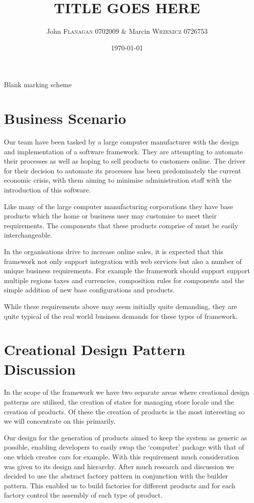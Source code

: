 \documentclass[pdftex,11pt,a4paper]{article}
\author{John \textsc{Flanagan} 0702009 \& Marcin \textsc{Wrzeszcz} 0726753 }
\title{TITLE GOES HERE}
\date{\today}
\begin{document}


\begin{center}
	Blank marking scheme
\end{center}

\pagebreak

\tableofcontents
\pagebreak

\section{Business Scenario}
Our team have been tasked by a large computer manufacturer with the design and implementation of a software framework. They are attempting to automate their processes as well as hoping to sell products to customers online. The driver for their decision to automate  its processes has been predominately the current economic crisis, with them aiming to minimise administration staff with the introduction of this software. 

Like many of the large computer manufacturing corporations they have base products which the home or business user may customise to meet their requirements. The components that these products comprise of must be easily interchangeable. 

In the organisations drive to increase online sales, it is expected that this framework not only support integration with web services but also a number of unique business requirements. For example the framework should support support multiple regions taxes and currencies, composition rules for components and the simple addition of new base configurations and products.

While these requirements above may seem initially quite demanding, they are quite typical of the real world business demands for these types of framework.

\pagebreak

\section{Creational Design Pattern Discussion}
In the scope of the framework we have two separate areas where creational design patterns are utilised, the creation of states for managing store locale and the creation of products. Of these the creation of products is the most interesting so we will concentrate on this primarily.

Our design for the generation of products aimed to keep the system as generic as possible, enabling developers to easily swap the ‘computer’ package with that of one which creates cars for example. With this requirement much consideration was given to its design and hierarchy. After much research and discussion we decided to use the abstract factory pattern in conjunction with the builder pattern. This enabled us to build factories for different products and for each factory control the assembly of each type of product.
\end{document}
